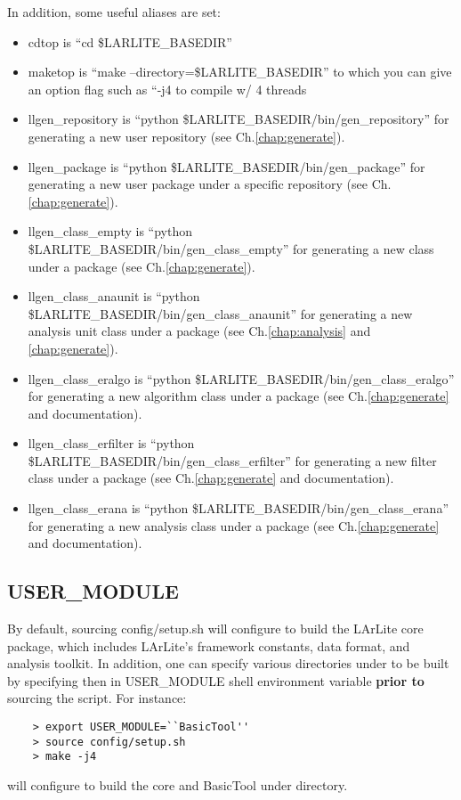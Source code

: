 In addition, some useful aliases are set:
\begin{itemize}
  \item {\ttfamily cdtop} is ``{\ttfamily cd \$LARLITE\_BASEDIR}''
  \item {\ttfamily maketop} is ``{\ttfamily make --directory=\$LARLITE\_BASEDIR}'' to which you can give an option flag such as ``{\ttfamily -j4} to compile w/ 4 threads
  \item {\ttfamily llgen\_repository} is ``{\ttfamily python \$LARLITE\_BASEDIR/bin/gen\_repository}'' for generating a new user repository (see Ch.\ref{chap:generate}).
  \item {\ttfamily llgen\_package} is ``{\ttfamily python \$LARLITE\_BASEDIR/bin/gen\_package}'' for generating a new user package under a specific repository (see Ch.\ref{chap:generate}).
  \item {\ttfamily llgen\_class\_empty} is ``{\ttfamily python \$LARLITE\_BASEDIR/bin/gen\_class\_empty}'' for generating a new \CPP class under a package (see Ch.\ref{chap:generate}).
  \item {\ttfamily llgen\_class\_anaunit} is ``{\ttfamily python \$LARLITE\_BASEDIR/bin/gen\_class\_anaunit}'' for generating a new analysis unit \CPP class under a package (see Ch.\ref{chap:analysis} and \ref{chap:generate}).
  \item {\ttfamily llgen\_class\_eralgo} is ``{\ttfamily python \$LARLITE\_BASEDIR/bin/gen\_class\_eralgo}'' for generating a new \ertool algorithm class under a package (see Ch.\ref{chap:generate} and {\ertool} documentation).
  \item {\ttfamily llgen\_class\_erfilter} is ``{\ttfamily python \$LARLITE\_BASEDIR/bin/gen\_class\_erfilter}'' for generating a new \ertool filter class under a package (see Ch.\ref{chap:generate} and {\ertool} documentation).
  \item {\ttfamily llgen\_class\_erana} is ``{\ttfamily python \$LARLITE\_BASEDIR/bin/gen\_class\_erana}'' for generating a new \ertool analysis class under a package (see Ch.\ref{chap:generate} and {\ertool} documentation).
\end{itemize}

\subsection{{\ttfamily USER\_MODULE}}
By default, sourcing {\ttfamily config/setup.sh} will configure to build the LArLite {\ttfamily core} package, 
which includes LArLite's framework constants, data format, and analysis toolkit. In addition, one can specify
various directories under \UserDev to be built by specifying then in {\ttfamily USER\_MODULE} shell environment
variable {\bf prior to} sourcing the script. For instance:

\begin{lstlisting}
    > export USER_MODULE=``BasicTool''
    > source config/setup.sh
    > make -j4
\end{lstlisting}

will configure to build the {\ttfamily core} and {\ttfamily BasicTool} under \UserDev directory.
